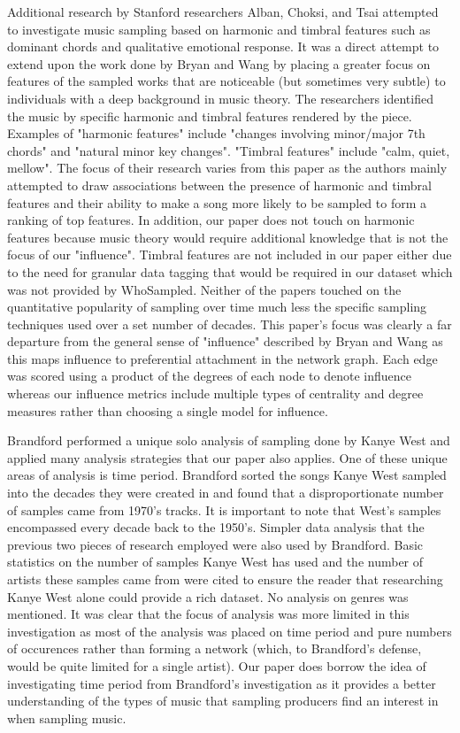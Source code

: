 \documentclass[pageno]{jpaper}
\begin{document}
Additional research by Stanford researchers Alban, Choksi, and Tsai attempted to investigate music sampling based on harmonic and timbral features such as dominant chords and qualitative emotional response. It was a direct attempt to extend upon the work done by Bryan and Wang by placing a greater focus on features of the sampled works that are noticeable (but sometimes very subtle) to individuals with a deep background in music theory. The researchers identified the music by specific harmonic and timbral features rendered by the piece. Examples of "harmonic features" include "changes involving minor/major 7th chords" and "natural minor key changes". "Timbral features" include "calm, quiet, mellow". The focus of their research varies from this paper as the authors mainly attempted to draw associations between the presence of harmonic and timbral features and their ability to make a song more likely to be sampled to form a ranking of top features. In addition, our paper does not touch on harmonic features because music theory would require additional knowledge that is not the focus of our "influence". Timbral features are not included in our paper either due to the need for granular data tagging that would be required in our dataset which was not provided by WhoSampled. Neither of the papers touched on the quantitative popularity of sampling over time much less the specific sampling techniques used over a set number of decades. This paper's focus was clearly a far departure from the general sense of "influence" described by Bryan and Wang as this maps influence to preferential attachment in the network graph. Each edge was scored using a product of the degrees of each node to denote influence whereas our influence metrics include multiple types of centrality and degree measures rather than choosing a single model for influence. \cite{Alban}

Brandford performed a unique solo analysis of sampling done by Kanye West and applied many analysis strategies that our paper also applies. One of these unique areas of analysis is time period. Brandford sorted the songs Kanye West sampled into the decades they were created in and found that a disproportionate number of samples came from 1970's tracks. It is important to note that West's samples encompassed every decade back to the 1950's. Simpler data analysis that the previous two pieces of research employed were also used by Brandford. Basic statistics on the number of samples Kanye West has used and the number of artists these samples came from were cited to ensure the reader that researching Kanye West alone could provide a rich dataset. No analysis on genres was mentioned. It was clear that the focus of analysis was more limited in this investigation as most of the analysis was placed on time period and pure numbers of occurences rather than forming a network (which, to Brandford's defense, would be quite limited for a single artist). Our paper does borrow the idea of investigating time period from Brandford's investigation as it provides a better understanding of the types of music that sampling producers find an interest in when sampling music. \cite{Brandford}
\end{document}
